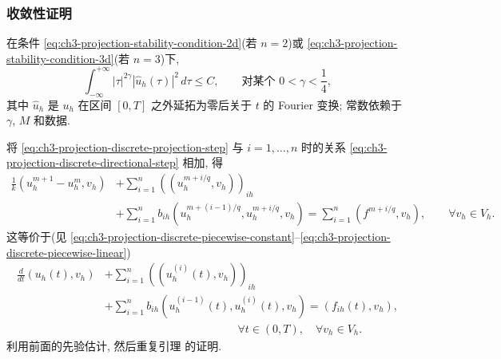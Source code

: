\subsubsection{收敛性证明}
\label{subsubsec:ch3-projection-discrete-convergence-proof}

\begin{Lemma}
\label{lem:ch3-projection-discrete-fourier-bound}
在条件 \eqref{eq:ch3-projection-stability-condition-2d}(若 $n=2$)或 \eqref{eq:ch3-projection-stability-condition-3d}(若 $n=3$)下,
\[
\int_{-\infty}^{+\infty}|\tau|^{2\gamma}
|\widehat u_h(\tau)|^2\,d\tau\leq C,
\qquad\text{对某个 }0<\gamma<\frac14,
\]
其中 $\widehat u_h$ 是 $u_h$ 在区间 $[0,T]$ 之外延拓为零后关于 $t$ 的 Fourier 变换; 常数依赖于 $\gamma$, $M$ 和数据.
\end{Lemma}

\begin{Proof}
将 \eqref{eq:ch3-projection-discrete-projection-step} 与 $i=1,\ldots,n$ 时的关系 \eqref{eq:ch3-projection-discrete-directional-step} 相加, 得
\[
\begin{aligned}
\frac1k(u_h^{m+1}-u_h^m,v_h)
&+\sum_{i=1}^n((u_h^{m+i/q},v_h))_{ih}\\
&+\sum_{i=1}^n
b_{ih}(u_h^{m+(i-1)/q},u_h^{m+i/q},v_h)
=\sum_{i=1}^n(f^{m+i/q},v_h),
\qquad\forall v_h\in V_h.
\end{aligned}
\]
这等价于(见 \eqref{eq:ch3-projection-discrete-piecewise-constant}--\eqref{eq:ch3-projection-discrete-piecewise-linear})
\begin{equation}
\begin{aligned}
\frac{d}{dt}(u_h(t),v_h)
&+\sum_{i=1}^n((u_h^{(i)}(t),v_h))_{ih}\\
&+\sum_{i=1}^n b_{ih}(u_h^{(i-1)}(t),u_h^{(i)}(t),v_h)
=(f_{ih}(t),v_h),\\
&\hspace{5cm}\forall t\in(0,T),\quad\forall v_h\in V_h.
\end{aligned}
\label{eq:ch3-projection-discrete-time-equation}
\end{equation}
利用前面的先验估计, 然后重复引理  的证明.
\end{Proof}

